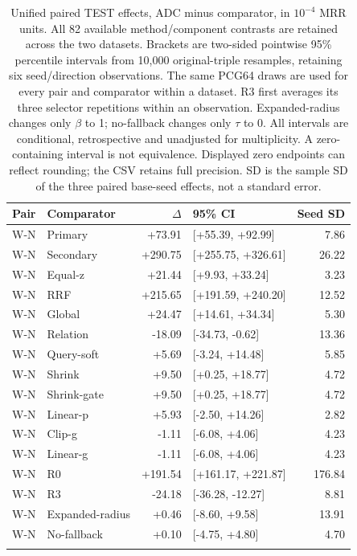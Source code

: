 \begin{table}[htbp]
\centering\footnotesize\setlength{\tabcolsep}{3pt}
\caption{Unified paired TEST effects, ADC minus comparator, in $10^{-4}$ MRR units. All 82 available method/component contrasts are retained across the two datasets. Brackets are two-sided pointwise 95\% percentile intervals from 10,000 original-triple resamples, retaining six seed/direction observations. The same PCG64 draws are used for every pair and comparator within a dataset. R3 first averages its three selector repetitions within an observation. Expanded-radius changes only $\beta$ to 1; no-fallback changes only $\tau$ to 0. All intervals are conditional, retrospective and unadjusted for multiplicity. A zero-containing interval is not equivalence. Displayed zero endpoints can reflect rounding; the CSV retains full precision. SD is the sample SD of the three paired base-seed effects, not a standard error.}
\label{tab:query-paired-mkgw}
\begin{tabular}{llrlr}
\toprule
Pair & Comparator & $\Delta$ & 95\% CI & Seed SD\\
\midrule
W-N & Primary & +73.91 & [+55.39, +92.99] & 7.86\\
W-N & Secondary & +290.75 & [+255.75, +326.61] & 26.22\\
W-N & Equal-z & +21.44 & [+9.93, +33.24] & 3.23\\
W-N & RRF & +215.65 & [+191.59, +240.20] & 12.52\\
W-N & Global & +24.47 & [+14.61, +34.34] & 5.30\\
W-N & Relation & -18.09 & [-34.73, -0.62] & 13.36\\
W-N & Query-soft & +5.69 & [-3.24, +14.48] & 5.85\\
W-N & Shrink & +9.50 & [+0.25, +18.77] & 4.72\\
W-N & Shrink-gate & +9.50 & [+0.25, +18.77] & 4.72\\
W-N & Linear-p & +5.93 & [-2.50, +14.26] & 2.82\\
W-N & Clip-g & -1.11 & [-6.08, +4.06] & 4.23\\
W-N & Linear-g & -1.11 & [-6.08, +4.06] & 4.23\\
W-N & R0 & +191.54 & [+161.17, +221.87] & 176.84\\
W-N & R3 & -24.18 & [-36.28, -12.27] & 8.81\\
W-N & Expanded-radius & +0.46 & [-8.60, +9.58] & 13.91\\
W-N & No-fallback & +0.10 & [-4.75, +4.80] & 4.70\\
\addlinespace

\end{tabular}
\end{table}
